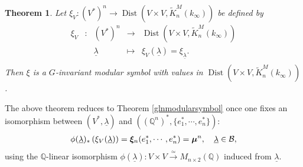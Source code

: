 \documentclass[12pt,amstex,amssymb]{article}
\theoremstyle{plain}
\newtheorem{theorem}{Theorem}[subsection]
\theoremstyle{definition}
\def\lra{\longrightarrow}
\def\cB{{\cal B}}
\def\cK{{\cal K}}
\def\Q{{\mathbb Q}}
\def\ulambda {{\underline{\lambda}}}
\def\sign {{\rm sign}}
\newcommand{\be}{\begin{eqnarray*}}
\newcommand{\ee}{\end{eqnarray*}}
\newcommand{\bea}{\begin{eqnarray}}
\newcommand{\eea}{\end{eqnarray}}
\newcommand{\Dist}{\operatorname{Dist}}
\begin{document}
\begin{theorem} \label{mainthm}
Let $\xi_V  : (V^\ast)^n  \lra  \Dist(V \times  V, \tilde K^M_n(k_\infty))$ be defined by
$$
\begin{array}{ccccc}
\xi_V  &: &(V^\ast)^n  &\lra&  \Dist(V \times  V, \tilde K^M_n(k_\infty))\\
&&\ulambda &\longmapsto& \xi_V(\ulambda)=\xi_\ulambda.\\
\end{array} 
$$
Then $\xi$ is a $G$-invariant modular symbol with values in $\Dist(V \times  V, \tilde K^M_n(k_\infty))$.
\end{theorem}
The above theorem reduces to Theorem \ref{glnmodularsymbol} once one fixes an isomorphism between $(V^*, \ulambda)$ and $((\Q^n)^*, \{e_1^*, \cdots, e_n^*\})$:
\be
\phi(\ulambda)_\ast \left( \xi_V(\ulambda)\right)  = \bm\xi_n (e_1^*, \cdots, e_n^*)=\bm\mu^n, \quad \ulambda \in \cB,
\ee
using the $\Q$-linear isomorphism $\phi(\ulambda): V\times V\xrightarrow{\simeq} M_{n\times 2}(\Q)$ induced from $\ulambda$.
\end{document}
